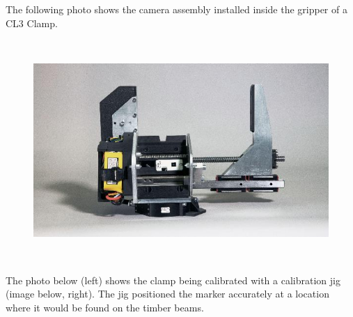 \documentclass[11pt]{book}
\begin{document}
The following photo shows the camera assembly installed inside the gripper of a CL3 Clamp. 

\begin{figure}[H]
\includegraphics[width=14.33cm,height=8.39cm]{./images/image16.jpeg}
\end{figure}


The photo below (left) shows the clamp being calibrated with a calibration jig (image below, right). The jig positioned the marker accurately at a location where it would be found on the timber beams.
\end{document}
